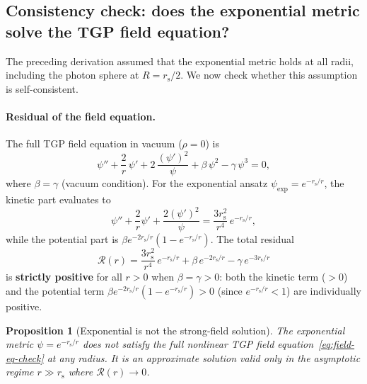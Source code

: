 \documentclass[11pt,a4paper]{article}
\newtheorem{proposition}[theorem]{Proposition}
\theoremstyle{definition}
\theoremstyle{remark}
\newcommand{\rs}{r_{\mathrm{s}}}
\begin{document}
\subsection{Consistency check: does the exponential metric solve the TGP field equation?}
\label{ssec:consistency}

The preceding derivation assumed that the exponential metric holds at
all radii, including the photon sphere at $R = \rs/2$.  We now check
whether this assumption is self-consistent.

\paragraph{Residual of the field equation.}
The full TGP field equation in vacuum ($\rho = 0$) is
\begin{equation}\label{eq:field-eq-check}
  \psi'' + \frac{2}{r}\,\psi' + 2\,\frac{(\psi')^2}{\psi}
  + \beta\,\psi^2 - \gamma\,\psi^3 = 0,
\end{equation}
where $\beta = \gamma$ (vacuum condition).  For the exponential ansatz
$\psi_{\mathrm{exp}} = e^{-\rs/r}$, the kinetic part evaluates to
\begin{equation}
  \psi'' + \frac{2}{r}\psi' + \frac{2(\psi')^2}{\psi}
  = \frac{3\rs^2}{r^4}\,e^{-\rs/r},
\end{equation}
while the potential part is $\beta e^{-2\rs/r}(1 - e^{-\rs/r})$.  The
total residual
\begin{equation}\label{eq:residual}
  \mathcal{R}(r) = \frac{3\rs^2}{r^4}\,e^{-\rs/r}
  + \beta\,e^{-2\rs/r} - \gamma\,e^{-3\rs/r}
\end{equation}
is \textbf{strictly positive} for all $r > 0$ when $\beta = \gamma > 0$:
both the kinetic term ($> 0$) and the potential term
$\beta e^{-2\rs/r}(1-e^{-\rs/r}) > 0$ (since $e^{-\rs/r} < 1$) are
individually positive.

\begin{proposition}[Exponential is not the strong-field solution]
\label{prop:not-exact}
The exponential metric $\psi = e^{-\rs/r}$ does not satisfy the full
nonlinear TGP field equation~\eqref{eq:field-eq-check} at any radius.
It is an approximate solution valid only in the asymptotic regime
$r \gg \rs$ where $\mathcal{R}(r) \to 0$.
\end{proposition}
\end{document}
